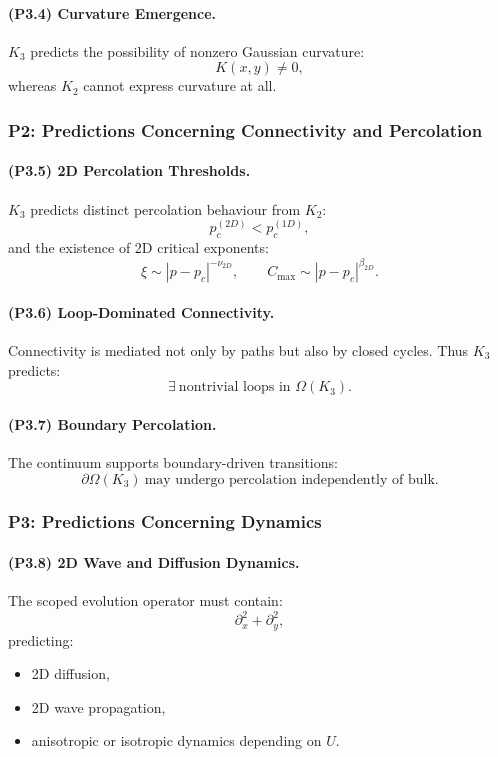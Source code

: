 \paragraph{(P3.4) Curvature Emergence.}
$K_3$ predicts the possibility of nonzero Gaussian curvature:
\[
K(x,y) \neq 0,
\]
whereas $K_2$ cannot express curvature at all.

\subsubsection{P2: Predictions Concerning Connectivity and Percolation}

\paragraph{(P3.5) 2D Percolation Thresholds.}
$K_3$ predicts distinct percolation behaviour from $K_2$:
\[
p_c^{(2D)} < p_c^{(1D)},
\]
and the existence of 2D critical exponents:
\[
\xi \sim |p - p_c|^{-\nu_{2D}},
\qquad
C_{\max} \sim |p - p_c|^{\beta_{2D}}.
\]

\paragraph{(P3.6) Loop-Dominated Connectivity.}
Connectivity is mediated not only by paths but also by closed cycles.
Thus $K_3$ predicts:
\[
\exists \ \text{nontrivial loops in } \Omega(K_3).
\]

\paragraph{(P3.7) Boundary Percolation.}
The continuum supports boundary-driven transitions:
\[
\partial\Omega(K_3) \ \text{may undergo percolation independently of bulk}.
\]

\subsubsection{P3: Predictions Concerning Dynamics}

\paragraph{(P3.8) 2D Wave and Diffusion Dynamics.}
The scoped evolution operator must contain:
\[
\partial_x^2 + \partial_y^2,
\]
predicting:
\begin{itemize}
    \item 2D diffusion,
    \item 2D wave propagation,
    \item anisotropic or isotropic dynamics depending on $U$.
\end{itemize}

